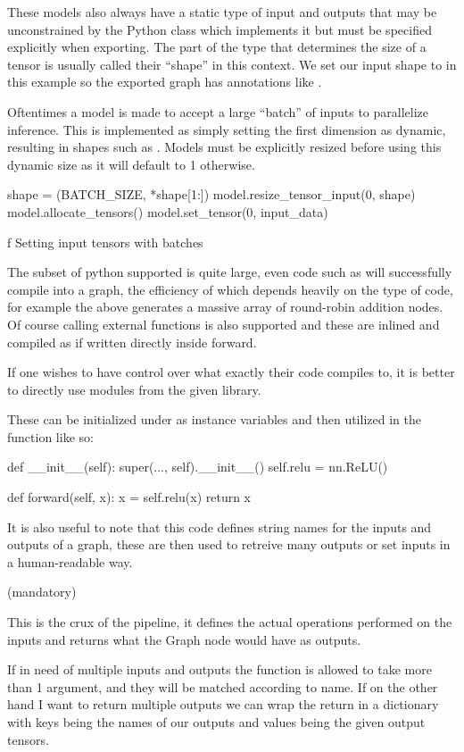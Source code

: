 These models also always have a static type of input and outputs
that may be unconstrained by the Python class which implements it
but must be specified explicitly when exporting.
The part of the type that determines the size of a tensor
is usually called their ``shape'' in this context.
We set our input shape to  in this example
so the exported graph has annotations like .

Oftentimes a model is made to accept a large ``batch'' of inputs
to parallelize inference.
This is implemented as simply
setting the first dimension as dynamic,
resulting in shapes such as .
Models must be explicitly resized before using this dynamic size
as it will default to 1 otherwise.

\midinsert
\begtt {}
shape = (BATCH_SIZE, *shape[1:])
model.resize_tensor_input(0, shape)
model.allocate_tensors()
model.set_tensor(0, input_data)
\endtt
\caption/f Setting input tensors with batches
\endinsert

The subset of python supported is quite large,
even code such as 
will successfully compile into a graph,
the efficiency of which depends heavily on
the type of code,
for example the above generates a massive
array of round-robin addition nodes.
Of course calling external functions is also supported
and these are inlined and compiled as if written
directly inside forward.

If one wishes to have control over what
exactly their code compiles to,
it is better to directly use modules from the given library.

These can be initialized under 
as instance variables and then utilized in
the  function like so:

\begtt {}
def __init__(self):
  super(..., self).__init__()
  self.relu = nn.ReLU()

def forward(self, x):
  x = self.relu(x)
  return x
\endtt

It is also useful to note that this code defines
string names for the inputs and outputs of a graph,
these are then used to retreive many outputs or set inputs
in a human-readable way.

\secc {} (mandatory)

This is the crux of the pipeline,
it defines the actual operations performed on
the inputs and returns what the Graph node would have
as outputs.

If in need of multiple inputs and outputs
the function is allowed to take more than 1 argument,
and they will be matched according to name.
If on the other hand I want to return
multiple outputs we can wrap
the return in a dictionary with keys
being the names of our outputs and values being
the given output tensors.

